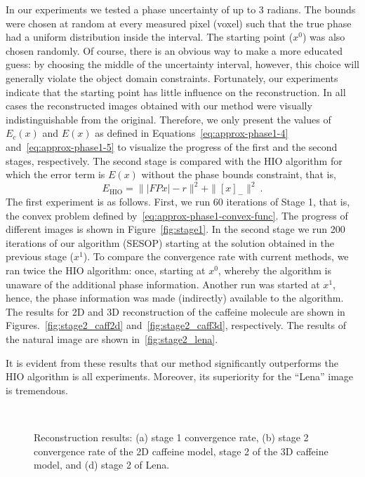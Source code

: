 In our experiments we tested a phase uncertainty of up to 3 radians. The
bounds were chosen at random at every measured pixel (voxel) such that
the true phase had a uniform distribution inside the interval. The
starting point ($x^{0}$) was also chosen randomly. Of course, there is
an obvious way to make a more educated guess: by choosing the middle
of the uncertainty interval, however, this choice will generally violate the
object domain constraints. Fortunately, our experiments indicate that
the starting point has little influence on the reconstruction. In all cases the
reconstructed images obtained with our method were visually
indistinguishable from the original. Therefore, we only present the values
of $E_c(x)$ and $E(x)$ as defined in
Equations~\eqref{eq:approx-phase1-4} and~\eqref{eq:approx-phase1-5}
to visualize the progress of the first and the second stages,
respectively. The second stage is compared with the HIO algorithm for
which the error term is $E(x)$ without the phase bounds constraint,
that is,
\begin{equation}
  \label{eq:1}
  E_{\mathrm{HIO}}=\||FPx|-r\|^2 + \|[x]_{-}\|^{2} \ .
\end{equation}
The first experiment is as follows. First, we run 60 iterations of
Stage 1, that is, the convex problem defined
by~\eqref{eq:approx-phase1-convex-func}. The
progress of different images is shown in Figure~\ref{fig:stage1}. In
the second stage we run 200 iterations of our algorithm (SESOP)
starting at the solution obtained in the previous stage ($x^{1}$). To
compare the convergence rate with current methods, we ran twice
the HIO algorithm: once, starting at $x^{0}$, whereby the algorithm is
unaware of the additional phase information. Another run was started
at $x^{1}$, hence, the phase information was made (indirectly) available
to the algorithm. The results for 2D and 3D reconstruction of the
caffeine molecule are shown in Figures.~\ref{fig:stage2_caff2d}
and~\ref{fig:stage2_caff3d}, respectively. The results of the natural
image are shown in~\ref{fig:stage2_lena}.


It is evident from these results that our method significantly
outperforms the HIO algorithm is all experiments. Moreover, its
superiority for the ``Lena'' image is tremendous. 
\begin{figure}[H]
  \centering
  \hspace{.1\linewidth}
  \\
  \hspace{.1\linewidth}
  \caption[Reconstruction with approximately known
  phase]{Reconstruction results: (a) stage 1 convergence rate, (b)
    stage 2 convergence rate of the 2D caffeine model, stage 2 of the
    3D caffeine model, and (d) stage 2 of Lena.}
  \label{fig:stage2}
\end{figure}

